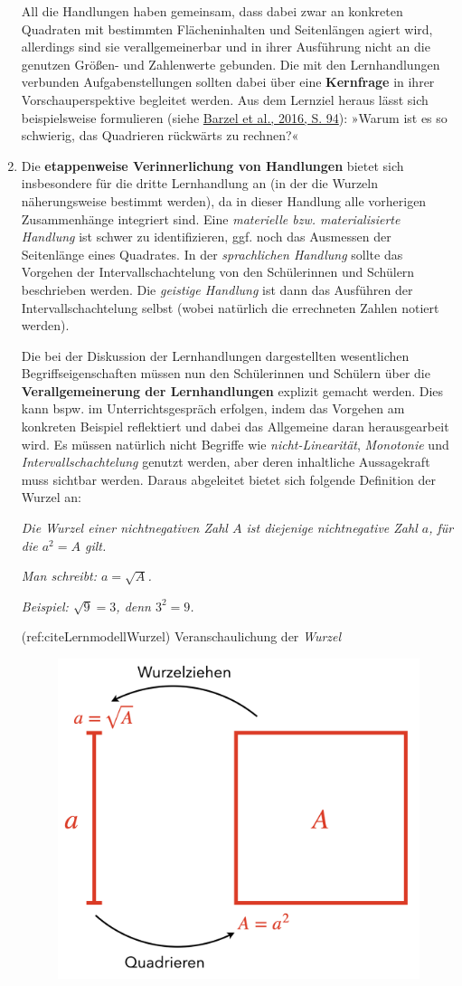 \documentclass[
]{scrbook}
\theoremstyle{definition}
\theoremstyle{definition}
\theoremstyle{definition}
\theoremstyle{definition}
\theoremstyle{remark}
\begin{document}
\begin{enumerate}
  All die Handlungen haben gemeinsam, dass dabei zwar an konkreten Quadraten mit bestimmten Flächeninhalten und Seitenlängen agiert wird, allerdings sind sie verallgemeinerbar und in ihrer Ausführung nicht an die genutzen Größen- und Zahlenwerte gebunden. Die mit den Lernhandlungen verbunden Aufgabenstellungen sollten dabei über eine \textbf{Kernfrage} in ihrer Vorschauperspektive begleitet werden. Aus dem Lernziel heraus lässt sich beispielsweise formulieren (siehe \protect\hyperlink{ref-Barzel2016}{Barzel et al., 2016, S. 94}): »Warum ist es so schwierig, das Quadrieren rückwärts zu rechnen?«
\item
  Die \textbf{etappenweise Verinnerlichung von Handlungen} bietet sich insbesondere für die dritte Lernhandlung an (in der die Wurzeln näherungsweise bestimmt werden), da in dieser Handlung alle vorherigen Zusammenhänge integriert sind. Eine \emph{materielle bzw. materialisierte Handlung} ist schwer zu identifizieren, ggf. noch das Ausmessen der Seitenlänge eines Quadrates. In der \emph{sprachlichen Handlung} sollte das Vorgehen der Intervallschachtelung von den Schülerinnen und Schülern beschrieben werden. Die \emph{geistige Handlung} ist dann das Ausführen der Intervallschachtelung selbst (wobei natürlich die errechneten Zahlen notiert werden).

  Die bei der Diskussion der Lernhandlungen dargestellten wesentlichen Begriffseigenschaften müssen nun den Schülerinnen und Schülern über die \textbf{Verallgemeinerung der Lernhandlungen} explizit gemacht werden. Dies kann bspw. im Unterrichtsgespräch erfolgen, indem das Vorgehen am konkreten Beispiel reflektiert und dabei das Allgemeine daran herausgearbeit wird. Es müssen natürlich nicht Begriffe wie \emph{nicht-Linearität}, \emph{Monotonie} und \emph{Intervallschachtelung} genutzt werden, aber deren inhaltliche Aussagekraft muss sichtbar werden. Daraus abgeleitet bietet sich folgende Definition der Wurzel an:

  \emph{Die Wurzel einer nichtnegativen Zahl \(A\) ist diejenige nichtnegative Zahl \(a\), für die \(a^2 = A\) gilt.}

  \emph{Man schreibt: \(a = \sqrt{A}\).}

  \emph{Beispiel: \(\sqrt{9} = 3\), denn \(3^2 = 9\).}

  (ref:citeLernmodellWurzel) Veranschaulichung der \emph{Wurzel}

  \begin{figure}

   {\centering \includegraphics[width=0.5\linewidth]{pictures/10-Wurzel} 

}
\end{figure}
\end{enumerate}
\end{document}
